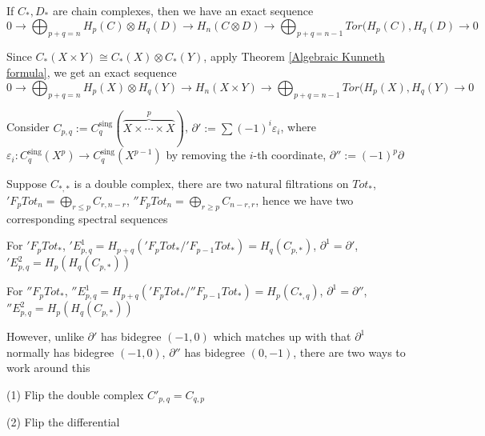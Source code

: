 \documentclass[../main.tex]{subfiles}
\begin{document}
\begin{theorem}\label{Algebraic Kunneth formula}
If $C_*,D_*$ are chain complexes, then we have an exact sequence
\[0\to\bigoplus_{p+q=n}H_p(C)\otimes H_q(D)\to H_n(C\otimes D)\to\bigoplus_{p+q=n-1}Tor(H_p(C),H_q(D)\to0\]
\end{theorem}

\begin{theorem}
Since $C_*(X\times Y)\cong C_*(X)\otimes C_*(Y)$, apply Theorem \ref{Algebraic Kunneth formula}, we get an exact sequence
\[0\to\bigoplus_{p+q=n}H_p(X)\otimes H_q(Y)\to H_n(X\times Y)\to\bigoplus_{p+q=n-1}Tor(H_p(X),H_q(Y)\to0\]
\end{theorem}

\begin{example}
Consider $C_{p,q}:=C^\mathrm{sing}_q(\overbrace{X\times\cdots\times X}^{p})$, $\partial':=\sum (-1)^i\varepsilon_i$, where $\varepsilon_i:C_q^\mathrm{sing}(X^p)\to C_q^\mathrm{sing}(X^{p-1})$ by removing the $i$-th coordinate, $\partial'':=(-1)^p\partial$
\end{example}

\begin{definition}
Suppose $C_{*,*}$ is a double complex, there are two natural filtrations on $Tot_*$, $\displaystyle'F_pTot_n=\bigoplus_{r\leq p}C_{r,n-r}$, $\displaystyle''F_pTot_n=\bigoplus_{r\geq p}C_{n-r,r}$, hence we have two corresponding spectral sequences \par
For $'F_pTot_*$, $'E^1_{p,q}=H_{p+q}('F_pTot_*/'F_{p-1}Tot_*)=H_q(C_{p,*})$, $\partial^1=\partial'$, $'E^2_{p,q}=H_p(H_q(C_{p,*}))$ \par
For $''F_pTot_*$, $''E^1_{p,q}=H_{p+q}('F_pTot_*/''F_{p-1}Tot_*)=H_p(C_{*,q})$, $\partial^1=\partial''$, $''E^2_{p,q}=H_p(H_q(C_{p,*}))$ \par
However, unlike $\partial'$ has bidegree $(-1,0)$ which matches up with that $\partial^1$ normally has bidegree $(-1,0)$, $\partial''$ has bidegree $(0,-1)$, there are two ways to work around this \par
(1) Flip the double complex $C'_{p,q}=C_{q,p}$ \par
(2) Flip the differential
\end{definition}
\end{document}

